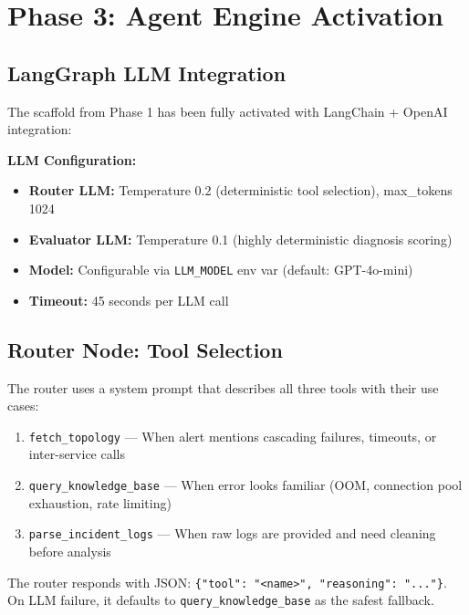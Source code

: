 \documentclass[11pt,a4paper]{article}
\begin{document}
\section{Phase 3: Agent Engine Activation}

\subsection{LangGraph LLM Integration}

The scaffold from Phase 1 has been fully activated with LangChain + OpenAI integration:

\begin{techbox}
\textbf{LLM Configuration:}
\begin{itemize}[leftmargin=*,itemsep=2pt]
  \item \textbf{Router LLM:} Temperature 0.2 (deterministic tool selection), max\_tokens 1024
  \item \textbf{Evaluator LLM:} Temperature 0.1 (highly deterministic diagnosis scoring)
  \item \textbf{Model:} Configurable via \texttt{LLM\_MODEL} env var (default: GPT-4o-mini)
  \item \textbf{Timeout:} 45 seconds per LLM call
\end{itemize}
\end{techbox}

\subsection{Router Node: Tool Selection}

The router uses a system prompt that describes all three tools with their use cases:

\begin{enumerate}[leftmargin=*,itemsep=2pt]
  \item \texttt{fetch\_topology} — When alert mentions cascading failures, timeouts, or inter-service calls
  \item \texttt{query\_knowledge\_base} — When error looks familiar (OOM, connection pool exhaustion, rate limiting)
  \item \texttt{parse\_incident\_logs} — When raw logs are provided and need cleaning before analysis
\end{enumerate}

The router responds with JSON: \texttt{\{"tool": "<name>", "reasoning": "..."\}}. On LLM failure, it defaults to \texttt{query\_knowledge\_base} as the safest fallback.
\end{document}
